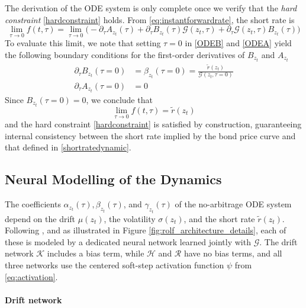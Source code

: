The derivation of the ODE system is only complete once we verify that the \textit{hard constraint} \eqref{hardconstraint} holds. From \eqref{eq:instantforwardrate}, the short rate is
$$\lim_{\tau\rightarrow0}f(t,\tau)=\lim_{\tau\rightarrow0}\bigg(-\partial_{\tau}A_{z_t}(\tau)+\partial_{\tau}B_{z_t}(\tau)\mathcal{G}(z_t,\tau)+\partial_{\tau}\mathcal{G}(z_t,\tau)B_{z_t}(\tau)\bigg)$$
To evaluate this limit, we note that setting $\tau=0$ in \eqref{ODEB} and \eqref{ODEA} yield the following boundary conditions for the first-order derivatives of $B_{z_t}$ and $A_{z_t}$
\begin{align}
\partial_\tau B_{z_t}(\tau=0) &=\beta_{z_t}(\tau=0)=\frac{\tilde{r}(z_t)}{\mathcal{G}(z_t,\tau=0)}
\label{boundcondB}\\
\partial_\tau A_{z_t}(\tau=0) &= 0
\label{boundcondA}
\end{align}
Since $B_{z_t}(\tau=0)=0$, we conclude that
$$\lim_{\tau\rightarrow0}f(t,\tau)=\tilde{r}(z_t)$$
and the hard constraint \eqref{hardconstraint} is satisfied by construction, guaranteeing internal consistency between the short rate implied by the bond price curve and that defined in \eqref{shortratedynamic}.





\subsection{Neural Modelling of the Dynamics}

The coefficients $\alpha_{z_t}(\tau),\beta_{z_t}(\tau)$, and $\gamma_{z_t}(\tau)$ of the no-arbitrage ODE system depend on the drift $\mu(z_t)$, the volatility $\sigma(z_t)$, and the short rate $\tilde{r}(z_t)$. Following \citet{MatinWanPoulsen2025}, and as illustrated in Figure \ref{fig:rolf_architecture_details}, each of these is modeled by a dedicated neural network learned jointly with $\mathcal{G}$. The drift network $\mathcal{K}$ includes a bias term, while $\mathcal{H}$ and $\mathcal{R}$ have no bias terms, and all three networks use the centered soft-step activation function $\psi$ from \eqref{eq:activation}.


\paragraph{Drift network}

